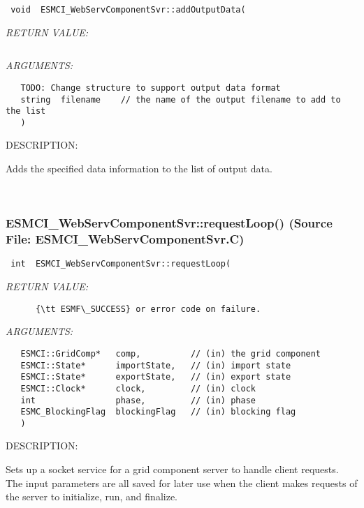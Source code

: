   
\begin{verbatim} void  ESMCI_WebServComponentSvr::addOutputData(\end{verbatim}{\em RETURN VALUE:}
\begin{verbatim} \end{verbatim}{\em ARGUMENTS:}
\begin{verbatim}   TODO: Change structure to support output data format
   string  filename    // the name of the output filename to add to the list
   )\end{verbatim}
{\sf DESCRIPTION:\\ }


      Adds the specified data information to the list of output data.
   
 
\mbox{}\hrulefill\
 
\subsubsection{ESMCI\_WebServComponentSvr::requestLoop() (Source File: ESMCI\_WebServComponentSvr.C)}


  
\begin{verbatim} int  ESMCI_WebServComponentSvr::requestLoop(\end{verbatim}{\em RETURN VALUE:}
\begin{verbatim}      {\tt ESMF\_SUCCESS} or error code on failure.\end{verbatim}{\em ARGUMENTS:}
\begin{verbatim}   ESMCI::GridComp*   comp,          // (in) the grid component
   ESMCI::State*      importState,   // (in) import state
   ESMCI::State*      exportState,   // (in) export state
   ESMCI::Clock*      clock,         // (in) clock
   int                phase,         // (in) phase
   ESMC_BlockingFlag  blockingFlag   // (in) blocking flag
   )\end{verbatim}
{\sf DESCRIPTION:\\ }


      Sets up a socket service for a grid component server to handle client
      requests.  The input parameters are all saved for later use when the
      client makes requests of the server to initialize, run, and finalize.
   
 
